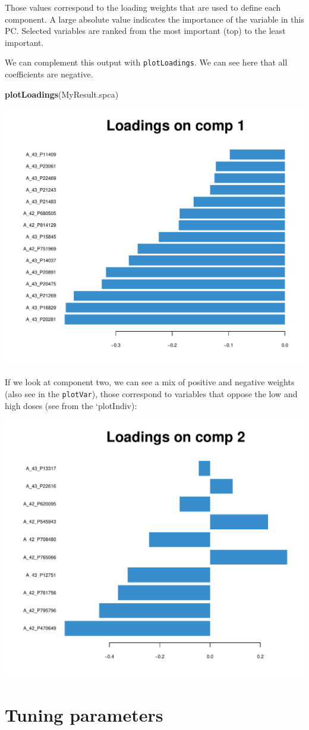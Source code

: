 \documentclass[]{book}
\newenvironment{Shaded}{\begin{snugshade}}{\end{snugshade}}
\newcommand{\KeywordTok}[1]{\textcolor[rgb]{0.13,0.29,0.53}{\textbf{#1}}}
\newcommand{\NormalTok}[1]{#1}
\begin{document}
Those values correspond to the loading weights that are used to define each component. A large absolute value indicates the importance of the variable in this PC. Selected variables are ranked from the most important (top) to the least important.

We can complement this output with \texttt{plotLoadings}. We can see here that all coefficients are negative.

\begin{Shaded}
\begin{Highlighting}[]
\KeywordTok{plotLoadings}\NormalTok{(MyResult.spca)}
\end{Highlighting}
\end{Shaded}

\begin{center}\includegraphics[width=0.5\linewidth,]{Figures/03-pca-liver-plotLoadings-1} \end{center}

If we look at component two, we can see a mix of positive and negative weights (also see in the \texttt{plotVar}), those correspond to variables that oppose the low and high doses (see from the `plotIndiv):

\begin{center}\includegraphics[width=0.5\linewidth,]{Figures/03-pca-liver-comp2-1} \end{center}

\hypertarget{tuning-parameters}{%
\section{Tuning parameters}\label{tuning-parameters}}
\end{document}
